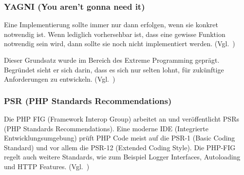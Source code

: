 \subsubsection{YAGNI (You aren't gonna need it)}
Eine Implementierung sollte immer nur dann erfolgen, wenn sie konkret notwendig ist.
Wenn lediglich vorhersehbar ist, dass eine gewisse Funktion notwendig sein wird, dann sollte sie noch nicht implementiert werden.
(Vgl.~\cite{extreme-programming-installed})

Dieser Grundsatz wurde im Bereich des Extreme Programming geprägt.
Begründet sieht er sich darin, dass es sich nur selten lohnt, für zukünftige Anforderungen zu entwickeln.
(Vgl.~\cite{kiss-principle-explained})

\newpage

\subsubsection{PSR (PHP Standards Recommendations)}
Die PHP FIG (Framework Interop Group) arbeitet an und veröffentlicht PSRs (PHP Standards Recommendations).
Eine moderne IDE (Integrierte Entwicklungsumgebung) prüft PHP Code meist auf die PSR-1 (Basic Coding Standard) und vor allem die PSR-12 (Extended Coding Style).
Die PHP-FIG regelt auch weitere Standards, wie zum Beispiel Logger Interfaces, Autoloading und HTTP Features.
(Vgl.~\cite{psr})
